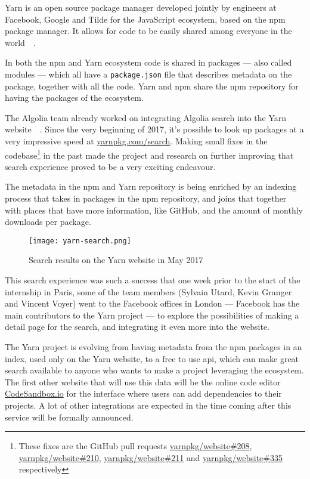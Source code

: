 Yarn is an open source package manager developed jointly by engineers at Facebook, Google and Tilde for the JavaScript ecosystem, based on the npm package manager. It allows for code to be easily shared among everyone in the world~\cite{yarn-site}~.

In both the npm and Yarn ecosystem code is shared in packages --- also called modules --- which all have a {\tt package.json} file that describes metadata on the package, together with all the code. Yarn and npm share the npm repository for having the packages of the ecosystem.

The Algolia team already worked on integrating Algolia search into the Yarn website~\cite{yarn-pr-add-algolia}~. Since the very beginning of 2017, it’s possible to look up packages at a very impressive speed at \href{https://yarnpkg.com/search}{yarnpkg.com/search}. Making small fixes in the codebase\footnote{These fixes are the GitHub pull requests \href{https://github.com/yarnpkg/website/pulls/208}{yarnpkg/website\#208}, \href{https://github.com/yarnpkg/website/pulls/210}{yarnpkg/website\#210}, \href{https://github.com/yarnpkg/website/pulls211}{yarnpkg/website\#211} and \href{https://github.com/yarnpkg/website/pulls/335}{yarnpkg/website\#335} respectively} in the past made the project and research on further improving that search experience proved to be a very exciting endeavour.

The metadata in the npm and Yarn repository is being enriched by an indexing process\cite{npm-search} that takes in packages in the npm repository, and joins that together with places that have more information, like GitHub, and the amount of monthly downloads per package.

\begin{figure}[H]
  \centering
  \texttt{[image: yarn-search.png]}
  \caption{Search results on the Yarn website in May 2017}
  \label{figure:yarn-search}
\end{figure}

This search experience was such a success that one week prior to the start of the internship in Paris, some of the team members (Sylvain Utard, Kevin Granger and Vincent Voyer) went to the Facebook offices in London --- Facebook has the main contributors to the Yarn project --- to explore the possibilities of making a detail page for the search, and integrating it even more into the website.

The Yarn project is evolving from having metadata from the npm packages in an index, used only on the Yarn website, to a free to use \acrshort{api}, which can make great search available to anyone who wants to make a project leveraging the ecosystem. The first other website that will use this data will be the online code editor \href{https://codesandbox.io}{CodeSandbox.io} for the interface where users can add dependencies to their projects. A lot of other integrations are expected in the time coming after this service will be formally announced.


